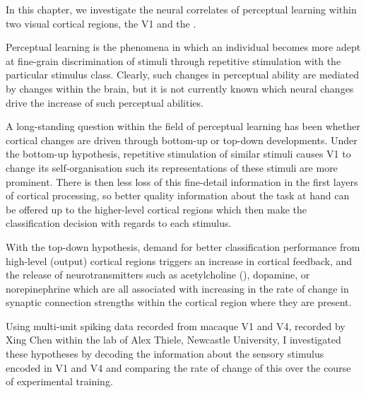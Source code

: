 In this chapter, we investigate the neural correlates of perceptual learning within two visual cortical regions, the \acf{V1} and the .

Perceptual learning is the phenomena in which an individual becomes more adept at fine-grain discrimination of stimuli through repetitive stimulation with the particular stimulus class.
Clearly, such changes in perceptual ability are mediated by changes within the brain, but it is not currently known which neural changes drive the increase of such perceptual abilities.

A long-standing question within the field of perceptual learning has been whether cortical changes are driven through bottom-up or top-down developments.
Under the bottom-up hypothesis, repetitive stimulation of similar stimuli causes \ac{V1} to change its self-organisation such its representations of these stimuli are more prominent.
There is then less loss of this fine-detail information in the first layers of cortical processing, so better quality information about the task at hand can be offered up to the higher-level cortical regions which then make the classification decision with regards to each stimulus.

With the top-down hypothesis, demand for better classification performance from high-level (output) cortical regions triggers an increase in cortical feedback, and the release of neurotransmitters such as acetylcholine (), dopamine, or norepinephrine which are all associated with increasing in the rate of change in synaptic connection strengths within the cortical region where they are present.

Using multi-unit spiking data recorded from macaque \ac{V1} and \ac{V4}, recorded by Xing Chen within the lab of Alex Thiele, Newcastle University, I investigated these hypotheses by decoding the information about the sensory stimulus encoded in \ac{V1} and \ac{V4} and comparing the rate of change of this over the course of experimental training.
